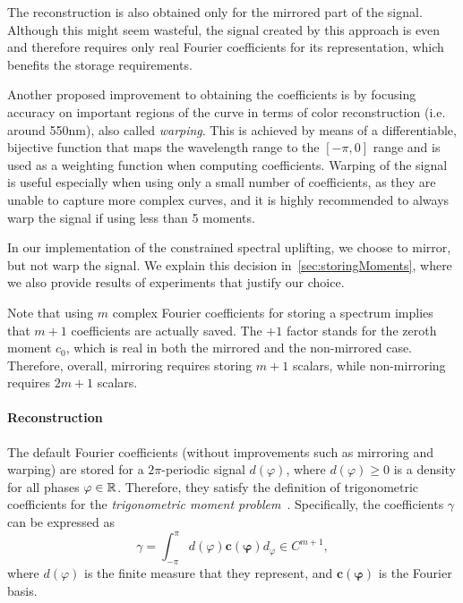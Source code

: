 The reconstruction is also obtained only for the mirrored part of the signal. Although this might seem wasteful, the signal created by this approach is even and therefore requires only real Fourier coefficients for its representation, which benefits the storage requirements.

Another proposed improvement to obtaining the coefficients is by focusing accuracy on important regions of the curve in terms of color reconstruction (i.e. around 550nm), also called \emph{warping}. This is achieved by means of a differentiable, bijective function that maps the wavelength range to the $[-\pi, 0]$ range and is used as a weighting function when computing coefficients. Warping of the signal is useful especially when using only a small number of coefficients, as they are unable to capture more complex curves, and it is highly recommended to always warp the signal if using less than 5 moments.

In our implementation of the constrained spectral uplifting, we choose to mirror, but not warp the signal. We explain this decision in~\cref{sec:storingMoments}, where we also provide results of experiments that justify our choice.

Note that using $m$ complex Fourier coefficients for storing a spectrum implies that $m+1$ coefficients are actually saved. The $+1$ factor stands for the zeroth moment $c_0$, which is real in both the mirrored and the non-mirrored case. Therefore, overall, mirroring requires storing $m+1$ scalars, while non-mirroring requires $2m+1$ scalars.

\paragraph{Reconstruction} 

The default Fourier coefficients (without improvements such as mirroring and warping) are stored for a $2\pi$-periodic signal $d(\varphi)$, where $d(\varphi) \ge 0$ is a density for all phases $\varphi \in \mathbb{R}$. Therefore, they satisfy the definition of trigonometric coefficients for the \emph{trigonometric moment problem}~\cite{trigonometricMomentProblemDefiniton}. Specifically, the coefficients $\gamma$ can be expressed as
\begin{equation} \label{trigonometricCoeffsComputation}
\gamma = \int_{-\pi}^{\pi} d(\varphi) \mathbf{c(\varphi)}d_\varphi \in C^{m+1},
\end{equation}
where $d(\varphi)$ is the finite measure that they represent, and $\mathbf{c(\varphi)}$ is the Fourier basis.

